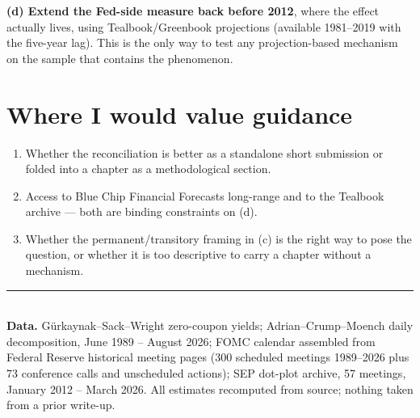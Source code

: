 \documentclass[11pt]{article}
\begin{document}
\noindent\textbf{(d) Extend the Fed-side measure back before 2012}, where the effect actually
lives, using Tealbook/Greenbook projections (available 1981--2019 with the five-year lag). This
is the only way to test any projection-based mechanism on the sample that contains the
phenomenon.

\section{Where I would value guidance}

\begin{enumerate}\setlength\itemsep{0.15em}
\item Whether the reconciliation is better as a standalone short submission or folded into a
chapter as a methodological section.
\item Access to Blue Chip Financial Forecasts long-range and to the Tealbook archive --- both
are binding constraints on (d).
\item Whether the permanent/transitory framing in (c) is the right way to pose the question,
or whether it is too descriptive to carry a chapter without a mechanism.
\end{enumerate}

\vspace{0.8em}
\noindent\rule{\textwidth}{0.4pt}\\[0.3em]
\footnotesize\textbf{Data.} Gürkaynak--Sack--Wright zero-coupon yields; Adrian--Crump--Moench
daily decomposition, June 1989 -- August 2026; FOMC calendar assembled from Federal Reserve
historical meeting pages (300 scheduled meetings 1989--2026 plus 73 conference calls and
unscheduled actions); SEP dot-plot archive, 57 meetings, January 2012 -- March 2026. All
estimates recomputed from source; nothing taken from a prior write-up.
\end{document}
